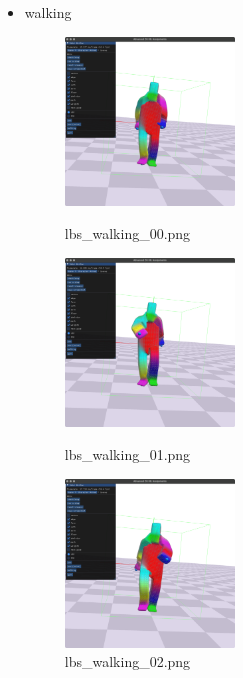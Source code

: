 \documentclass[a4paper,10pt,uplatex,dvipdfmx]{jsarticle}
\begin{document}
\begin{itemize}
  \item walking
  \begin{figure}[H]
    \begin{minipage}{0.33\hsize}
      \begin{center}
        \includegraphics[width=45mm]{img/lbs_walking_00.png}
        \caption{lbs\_walking\_00.png}
      \end{center}
    \end{minipage}
    \begin{minipage}{0.33\hsize}
      \begin{center}
        \includegraphics[width=45mm]{img/lbs_walking_01.png}
        \caption{lbs\_walking\_01.png}
      \end{center}
    \end{minipage}
    \begin{minipage}{0.33\hsize}
      \begin{center}
        \includegraphics[width=45mm]{img/lbs_walking_02.png}
        \caption{lbs\_walking\_02.png}
      \end{center}
    \end{minipage}
  \end{figure}
\end{itemize}
\end{document}

